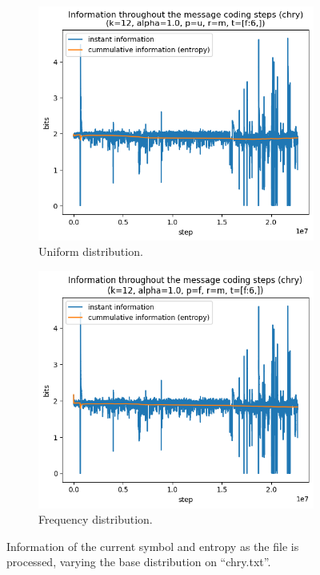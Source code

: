 \documentclass{article}
\begin{document}
\begin{figure}
    \begin{subfigure}[b]{0.45\textwidth}
        \begin{center}
            \includegraphics[width=1.0\linewidth]{../scripts/images/chry_12_1.0_u_m_[f:6,].png}
        \end{center}
        \caption{Uniform distribution.}
        \label{fig:results-distribution-uniform}
    \end{subfigure}
    \hfill
    \begin{subfigure}[b]{0.45\textwidth}
        \begin{center}
            \includegraphics[width=1.0\linewidth]{../scripts/images/chry_12_1.0_f_m_[f:6,].png}
        \end{center}
        \caption{Frequency distribution.}
        \label{fig:results-distribution-frequency}
    \end{subfigure}
    \caption{Information of the current symbol and entropy as the file is processed, varying the base distribution on ``chry.txt''.}
    \label{fig:results-distribution}
\end{figure}
\end{document}
